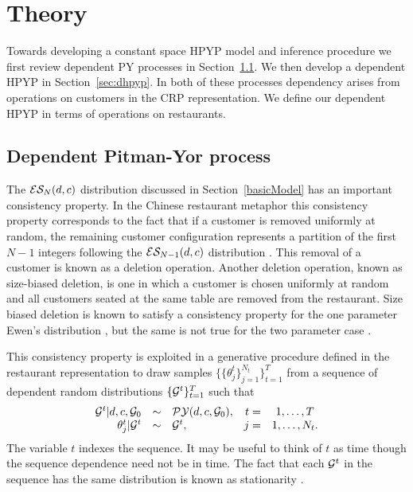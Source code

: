 \section{Theory}
\label{sec:theory}

Towards developing a constant space HPYP model and inference procedure we first review dependent PY processes in Section~\ref{sec:dpyp}.  We then develop a dependent HPYP in Section~\ref{sec:dhpyp}. In both of these processes dependency arises from operations on customers in the CRP representation. We define our dependent HPYP in terms of operations on restaurants.


\subsection{Dependent Pitman-Yor process} 
\label{sec:dpyp}

The $\ES_N(d,c)$ distribution discussed in Section~\ref{basicModel} has an important consistency property. In the Chinese restaurant metaphor this consistency property corresponds to the fact that if a customer is removed uniformly at random, the remaining customer configuration represents a partition of the first $N-1$ integers following the $\ES_{N-1}(d,c)$ distribution \cite{Pitman1995}.  This removal of a customer is known as a deletion operation.  Another deletion operation, known as size-biased deletion, is one in which a customer is chosen uniformly at random and all customers seated at the same table are removed from the restaurant. Size biased deletion is known to satisfy a consistency property for the one parameter Ewen's distribution \cite{Kingman1978}, but the same is not true for the two parameter case \cite{Pitman1995}.

This consistency property is exploited in a generative procedure defined in the restaurant representation to draw samples  $\{ \{ \theta_j^t \}_{j = 1}^{N_t}\}_{t = 1}^T$ from a sequence of dependent random distributions $\{ \G^t \}_{t=1}^T$ such that
%
\begin{equation}
\begin{array}{rclrcr}
\G^t | d, c, \G_0 &\sim& \PY(d,c,\G_0),  & t =&1, \dots, T\\
 \label{eqnDependentPY2}  \theta_j^t | \G^t &\sim& \G^t, & j =&1, \dots ,N_t.
 \end{array}
 \end{equation}
The variable $t$ indexes the sequence.  It may be useful to think of $t$ as time though the sequence dependence need not be in time. The fact that each $\G^t$ in the sequence has the same distribution is known as stationarity \cite{Brockwell1991}.  
 
